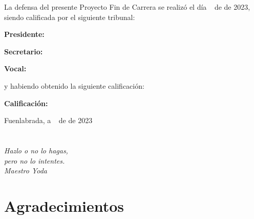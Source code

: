 \documentclass[a4paper, 12pt]{book}
\begin{document}
\vspace{1cm}
La defensa del presente Proyecto Fin de Carrera se realizó el día \qquad$\;\,$ de \qquad\qquad\qquad\qquad \newline de 2023, siendo calificada por el siguiente tribunal:


\vspace{0.5cm}
\textbf{Presidente:}

\vspace{1.2cm}
\textbf{Secretario:}

\vspace{1.2cm}
\textbf{Vocal:}


\vspace{1.2cm}
y habiendo obtenido la siguiente calificación:

\vspace{1cm}
\textbf{Calificación:}


\vspace{1cm}
\begin{flushright}
Fuenlabrada, a \qquad$\;\,$ de \qquad\qquad\qquad\qquad de 2023
\end{flushright}


\chapter*{}
\begin{flushright}
\textit{Hazlo o no lo hagas, \\
pero no lo intentes. \\
Maestro Yoda}
\end{flushright}


\chapter*{Agradecimientos}
\end{document}
